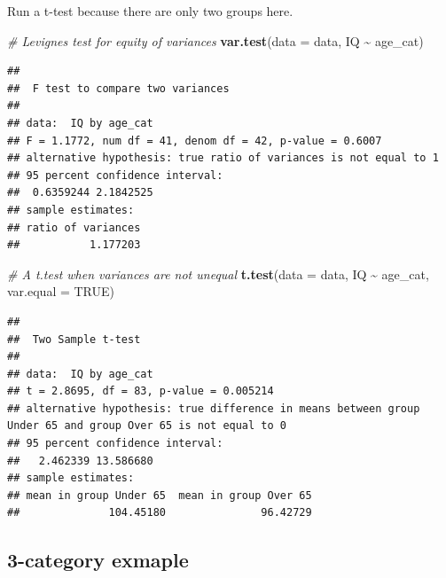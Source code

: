 \documentclass[
]{book}
\newenvironment{Shaded}{\begin{snugshade}}{\end{snugshade}}
\newcommand{\AttributeTok}[1]{\textcolor[rgb]{0.13,0.29,0.53}{#1}}
\newcommand{\CommentTok}[1]{\textcolor[rgb]{0.56,0.35,0.01}{\textit{#1}}}
\newcommand{\ConstantTok}[1]{\textcolor[rgb]{0.56,0.35,0.01}{#1}}
\newcommand{\FunctionTok}[1]{\textcolor[rgb]{0.13,0.29,0.53}{\textbf{#1}}}
\newcommand{\NormalTok}[1]{#1}
\newcommand{\SpecialCharTok}[1]{\textcolor[rgb]{0.81,0.36,0.00}{\textbf{#1}}}
\begin{document}
Run a t-test because there are only two groups here.

\begin{Shaded}
\begin{Highlighting}[]
\CommentTok{\# Levigne\textquotesingle{}s test for equity of variances}
\FunctionTok{var.test}\NormalTok{(}\AttributeTok{data =}\NormalTok{ data, IQ }\SpecialCharTok{\textasciitilde{}}\NormalTok{ age\_cat)}
\end{Highlighting}
\end{Shaded}

\begin{verbatim}
## 
##  F test to compare two variances
## 
## data:  IQ by age_cat
## F = 1.1772, num df = 41, denom df = 42, p-value = 0.6007
## alternative hypothesis: true ratio of variances is not equal to 1
## 95 percent confidence interval:
##  0.6359244 2.1842525
## sample estimates:
## ratio of variances 
##           1.177203
\end{verbatim}

\begin{Shaded}
\begin{Highlighting}[]
\CommentTok{\# A t.test when variances are not unequal}
\FunctionTok{t.test}\NormalTok{(}\AttributeTok{data =}\NormalTok{ data, IQ }\SpecialCharTok{\textasciitilde{}}\NormalTok{ age\_cat, }\AttributeTok{var.equal =} \ConstantTok{TRUE}\NormalTok{)}
\end{Highlighting}
\end{Shaded}

\begin{verbatim}
## 
##  Two Sample t-test
## 
## data:  IQ by age_cat
## t = 2.8695, df = 83, p-value = 0.005214
## alternative hypothesis: true difference in means between group Under 65 and group Over 65 is not equal to 0
## 95 percent confidence interval:
##   2.462339 13.586680
## sample estimates:
## mean in group Under 65  mean in group Over 65 
##              104.45180               96.42729
\end{verbatim}

\subsection*{3-category exmaple}\label{category-exmaple}
\end{document}

